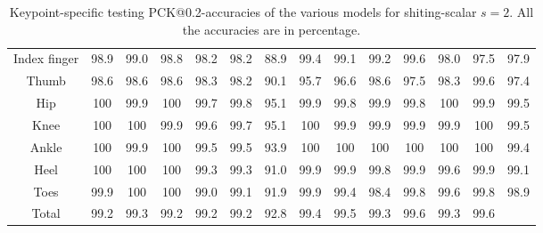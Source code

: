 \documentclass[./main.tex]{subfiles}
\begin{document}
\begin{table}[htbp]
\begin{adjustbox}{center}
\begin{tabular}{c||ccc|ccc|ccc|ccc|c}
            Index finger & 98.9 & 99.0 & 98.8 & 98.2 & 98.2 & 88.9 & 99.4 & 99.1 & 99.2 & 99.6 & 98.0 & 97.5 & 97.9 \\
            Thumb & 98.6 & 98.6 & 98.6 & 98.3 & 98.2 & 90.1 & 95.7 & 96.6 & 98.6 & 97.5 & 98.3 & 99.6 & 97.4 \\
            Hip & 100 & 99.9 & 100 & 99.7 & 99.8 & 95.1 & 99.9 & 99.8 & 99.9 & 99.8 & 100 & 99.9 & 99.5 \\
            Knee & 100 & 100 & 99.9 & 99.6 & 99.7 & 95.1 & 100 & 99.9 & 99.9 & 99.9 & 99.9 & 100 & 99.5 \\
            Ankle & 100 & 99.9 & 100 & 99.5 & 99.5 & 93.9 & 100 & 100 & 100 & 100 & 100 & 100 & 99.4 \\
            Heel & 100 & 100 & 100 & 99.3 & 99.3 & 91.0 & 99.9 & 99.9 & 99.8 & 99.9 & 99.6 & 99.9 & 99.1 \\
            Toes & 99.9 & 100 & 100 & 99.0 & 99.1 & 91.9 & 99.9 & 99.4 & 98.4 & 99.8 & 99.6 & 99.8 & 98.9 \\
            \hline
            Total & 99.2 & 99.3 & 99.2 & 99.2 & 99.2 & 92.8 & 99.4 & 99.5 & 99.3 & 99.6 & 99.3 & 99.6 & \\
            \hline
        \end{tabular}
        \caption{Keypoint-specific testing PCK@0.2-accuracies of the various models for shiting-scalar $s = 2$. All the accuracies are in percentage.}
        \label{tab:finetune_kpts_test_accs_2_2}
    \end{adjustbox}
\end{table}
\end{document}
